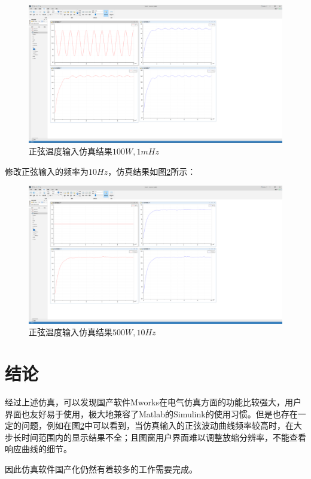 \documentclass[11pt]{article}
\begin{document}
\begin{figure}[H]
  \centering
  \includegraphics[width=1.0\textwidth]{正弦温度输入仿真100,0.001.png}
  \caption{正弦温度输入仿真结果$100\unit{W},1\unit{mHz}$}
  \label{fig:正弦温度输入仿真100,0.001}
\end{figure}
修改正弦输入的频率为$10\unit{Hz}$，仿真结果如图\ref{fig:正弦温度输入仿真100,10}所示：
\begin{figure}[H]
  \centering
  \includegraphics[width=1.0\textwidth]{正弦温度输入仿真100,10.png}
  \caption{正弦温度输入仿真结果$500\unit{W},10\unit{Hz}$}
  \label{fig:正弦温度输入仿真100,10}
\end{figure}
\section{结论}
经过上述仿真，可以发现国产软件Mworks在电气仿真方面的功能比较强大，用户界面也友好易于使用，极大地兼容了Matlab的Simulink的使用习惯。但是也存在一定的问题，例如在图\ref{fig:正弦温度输入仿真100,10}中可以看到，当仿真输入的正弦波动曲线频率较高时，在大步长时间范围内的显示结果不全；且图窗用户界面难以调整放缩分辨率，不能查看响应曲线的细节。

因此仿真软件国产化仍然有着较多的工作需要完成。
\newpage
\printbibliography[heading=bibliography,title=参考文献]
\end{document}
